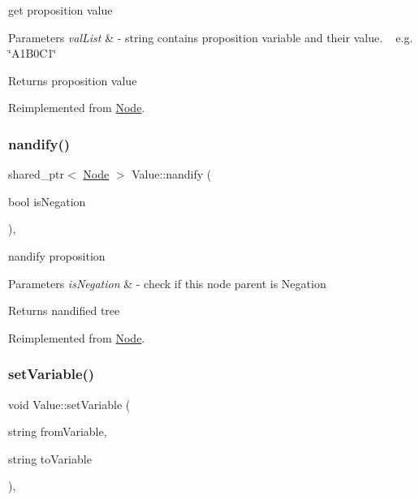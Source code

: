 get proposition value 


\begin{DoxyParams}{Parameters}
{\em val\+List} & -\/ string contains proposition variable and their value. ~\newline
 e.\+g. \char`\"{}\+A1\+B0\+C1\char`\"{} \\
\hline
\end{DoxyParams}
\begin{DoxyReturn}{Returns}
proposition value 
\end{DoxyReturn}


Reimplemented from \hyperlink{class_node_afd0c2045f3955e02e3aa1e2e987f10b2}{Node}.

\mbox{\label{class_value_aaa2ddacd71ab25b50b06eee47e21289d}} 
\subsubsection{\texorpdfstring{nandify()}{nandify()}}
{\footnotesize\ttfamily shared\+\_\+ptr$<$ \hyperlink{class_node}{Node} $>$ Value\+::nandify (\begin{DoxyParamCaption}\item[{bool}]{is\+Negation }\end{DoxyParamCaption})\hspace{0.3cm}{\ttfamily [override]}, {\ttfamily [virtual]}}



nandify proposition 


\begin{DoxyParams}{Parameters}
{\em is\+Negation} & -\/ check if this node parent is Negation \\
\hline
\end{DoxyParams}
\begin{DoxyReturn}{Returns}
nandified tree 
\end{DoxyReturn}


Reimplemented from \hyperlink{class_node_a3b2e192b59b7e72908af7903c5a4e5c1}{Node}.

\mbox{\label{class_value_a807844066d6d76e9b9f3eda03cef37b1}} 
\subsubsection{\texorpdfstring{set\+Variable()}{setVariable()}}
{\footnotesize\ttfamily void Value\+::set\+Variable (\begin{DoxyParamCaption}\item[{string}]{from\+Variable,  }\item[{string}]{to\+Variable }\end{DoxyParamCaption})\hspace{0.3cm}{\ttfamily [override]}, {\ttfamily [virtual]}}



